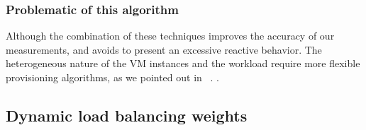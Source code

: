 \subsubsection{Problematic of this algorithm}

Although the combination of these techniques improves the accuracy of our measurements, and avoids to present an excessive reactive behavior. The heterogeneous nature of the VM instances and the workload require more flexible provisioning algorithms, as we pointed out in ~\cite{jiangThesis}. . 

\subsection{Dynamic load balancing weights}




